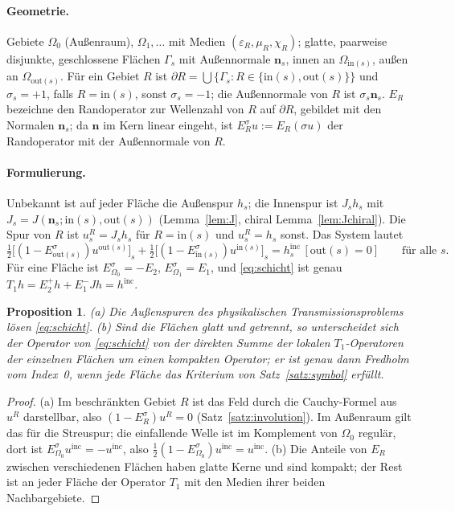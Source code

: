 \documentclass[11pt, a4paper]{article}
\newcommand{\mvec}[1]{\boldsymbol{#1}}
\newcommand{\n}{\mvec{n}}
\theoremstyle{plain}
\newtheorem{prop}[satz]{Proposition}
\theoremstyle{definition}
\newcommand{\status}[1]{\hfill{\small\sffamily[#1]}}
\begin{document}
\paragraph{Geometrie.} Gebiete $\Omega_0$ (Außenraum), $\Omega_1,\dots$ mit Medien $(\varepsilon_R,\mu_R,\chi_R)$;
glatte, paarweise disjunkte, geschlossene Flächen $\Gamma_s$ mit Außennormale $\n_s$, innen an $\Omega_{\mathrm{in}(s)}$,
außen an $\Omega_{\mathrm{out}(s)}$. Für ein Gebiet $R$ ist $\partial R=\bigcup\{\Gamma_s:R\in\{\mathrm{in}(s),
\mathrm{out}(s)\}\}$ und $\sigma_s=+1$, falls $R=\mathrm{in}(s)$, sonst $\sigma_s=-1$; die Außennormale von $R$ ist
$\sigma_s\n_s$. $E_R$ bezeichne den Randoperator zur Wellenzahl von $R$ auf $\partial R$, gebildet mit den Normalen
$\n_s$; da $\n$ im Kern linear eingeht, ist $E_R^\sigma u:=E_R(\sigma u)$ der Randoperator mit der Außennormale von
$R$.

\paragraph{Formulierung.} Unbekannt ist auf jeder Fläche die Außenspur $h_s$; die Innenspur ist $J_sh_s$ mit
$J_s=J(\n_s;\mathrm{in}(s),\mathrm{out}(s))$ (Lemma~\ref{lem:J}, chiral Lemma~\ref{lem:Jchiral}). Die Spur von $R$ ist
$u^R_s=J_sh_s$ für $R=\mathrm{in}(s)$ und $u^R_s=h_s$ sonst. Das System lautet
\begin{equation}\label{eq:schicht}
  \tfrac12\big[(1-E^\sigma_{\mathrm{out}(s)})u^{\mathrm{out}(s)}\big]_s
  +\tfrac12\big[(1-E^\sigma_{\mathrm{in}(s)})u^{\mathrm{in}(s)}\big]_s
  = h^{\mathrm{inc}}_s\,[\mathrm{out}(s)=0]\qquad\text{für alle }s .
\end{equation}
Für eine Fläche ist $E^\sigma_{\Omega_0}=-E_2$, $E^\sigma_{\Omega_1}=E_1$, und \eqref{eq:schicht} ist genau
$T_1h=E_2^+h+E_1^-Jh=h^{\mathrm{inc}}$.

\begin{prop}\label{prop:schicht}\status{bewiesen}
(a) Die Außenspuren des physikalischen Transmissionsproblems lösen \eqref{eq:schicht}.
(b) Sind die Flächen glatt und getrennt, so unterscheidet sich der Operator von \eqref{eq:schicht} von der
direkten Summe der lokalen $T_1$-Operatoren der einzelnen Flächen um einen kompakten Operator; er ist genau dann
Fredholm vom Index~0, wenn jede Fläche das Kriterium von Satz~\ref{satz:symbol} erfüllt.
\end{prop}
\begin{proof}
(a) Im beschränkten Gebiet $R$ ist das Feld durch die Cauchy-Formel aus $u^R$ darstellbar, also $(1-E^\sigma_R)u^R=0$
(Satz~\ref{satz:involution}). Im Außenraum gilt das für die Streuspur; die einfallende Welle ist im Komplement von
$\Omega_0$ regulär, dort ist $E^\sigma_{\Omega_0}u^{\mathrm{inc}}=-u^{\mathrm{inc}}$, also
$\tfrac12(1-E^\sigma_{\Omega_0})u^{\mathrm{inc}}=u^{\mathrm{inc}}$. (b) Die Anteile von $E_R$ zwischen verschiedenen
Flächen haben glatte Kerne und sind kompakt; der Rest ist an jeder Fläche der Operator $T_1$ mit den Medien ihrer
beiden Nachbargebiete.
\end{proof}
\end{document}
